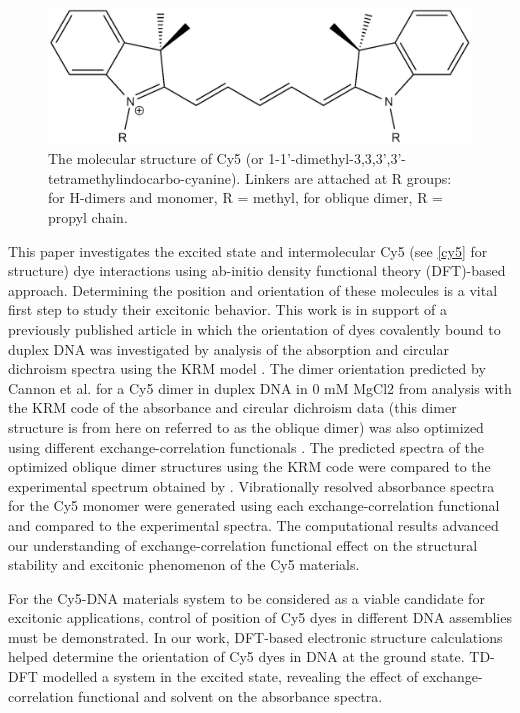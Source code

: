 \begin{figure}[h!]
    \centering
    \includegraphics[width=0.8\linewidth]{figures/pub1/Cy5.pdf}
    \caption{The molecular structure of Cy5 (or 1-1'-dimethyl-3,3,3',3'-tetramethylindocarbo-cyanine). Linkers are attached at R groups: for H-dimers and monomer, R = methyl, for oblique dimer, R = propyl chain.}\label{cy5}
\end{figure}
This paper investigates the excited state and intermolecular Cy5 (see \autoref{cy5} for structure) dye interactions using ab-initio density functional theory (DFT)-based approach. Determining the position and orientation of these molecules is a vital first step to study their excitonic behavior. This work is in support of a previously published article in which the orientation of dyes covalently bound to duplex DNA was investigated by analysis of the absorption and circular dichroism spectra using the KRM model \cite{Cannon2017}. The dimer orientation predicted by Cannon et al. for a Cy5 dimer in duplex DNA in 0 mM MgCl2 from analysis with the KRM code of the absorbance and circular dichroism data (this dimer structure is from here on referred to as the oblique dimer) was also optimized using different exchange-correlation functionals \cite{Cannon2017}. The predicted spectra of the optimized oblique dimer structures using the KRM code were compared to the experimental spectrum obtained by \citet{Cannon2017}. Vibrationally resolved absorbance spectra for the Cy5 monomer were generated using each exchange-correlation functional and compared to the experimental spectra. The computational results advanced our understanding of exchange-correlation functional effect on the structural stability and excitonic phenomenon of the Cy5 materials. 

For the Cy5-DNA materials system to be considered as a viable candidate for excitonic applications, control of position of Cy5 dyes in different DNA assemblies must be demonstrated. In our work, DFT-based electronic structure calculations helped determine the orientation of Cy5 dyes in DNA at the ground state. TD-DFT modelled a system in the excited state, revealing the effect of exchange-correlation functional and solvent on the absorbance spectra.

